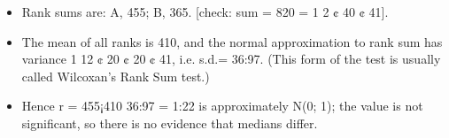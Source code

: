 \documentclass[a4paper,12pt]{article}
\begin{document}
\begin{enumerate}
\begin{itemize}
\item Rank sums are: A, 455; B, 365. [check: sum = 820 = 1
2 ¢ 40 ¢ 41]. 
\item The mean
of all ranks is 410, and the normal approximation to rank sum has variance
1
12 ¢ 20 ¢ 20 ¢ 41, i.e. s.d.= 36:97.
(This form of the test is usually called Wilcoxan’s Rank Sum test.)
\item Hence r = 455¡410
36:97 = 1:22 is approximately N(0; 1); the value is not significant,
so there is no evidence that medians differ.
\end{itemize}
\end{enumerate}
\end{document}
